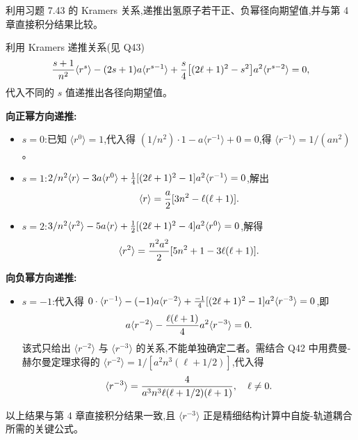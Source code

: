 \begin{question}
利用习题 7.43 的 Kramers 关系,递推出氢原子若干正、负幂径向期望值,并与第 4 章直接积分结果比较。
\begin{solution}
利用 Kramers 递推关系(见 Q43)
\[
{s+1\over n^2}\langle r^s\rangle - (2s+1)a\langle r^{s-1}\rangle + {s\over4}\bigl[(2\ell+1)^2-s^2\bigr]a^2\langle r^{s-2}\rangle = 0,
\]
代入不同的 $s$ 值递推出各径向期望值。

\textbf{向正幂方向递推:}
\begin{itemize}
\item $s=0$:已知 $\langle r^0\rangle=1$,代入得 $(1/n^2)\cdot1 - a\langle r^{-1}\rangle + 0=0$,得 $\langle r^{-1}\rangle=1/(an^2)$。
\item $s=1$:$2/n^2\langle r\rangle - 3a\langle r^0\rangle + {1\over4}[(2\ell+1)^2-1]a^2\langle r^{-1}\rangle = 0$,解出
  \[
  \langle r\rangle = {a\over2}[3n^2 - \ell(\ell+1)].
  \]
\item $s=2$:$3/n^2\langle r^2\rangle - 5a\langle r\rangle + {1\over2}[(2\ell+1)^2-4]a^2\langle r^0\rangle=0$,解得
  \[
  \langle r^2\rangle = {n^2a^2\over2}[5n^2+1-3\ell(\ell+1)].
  \]
\end{itemize}

\textbf{向负幂方向递推:}
\begin{itemize}
\item $s=-1$:代入得 $0\cdot\langle r^{-1}\rangle - (-1)a\langle r^{-2}\rangle + {-1\over4}[(2\ell+1)^2-1]a^2\langle r^{-3}\rangle=0$,即
  \[
  a\langle r^{-2}\rangle - {\ell(\ell+1)\over4}a^2\langle r^{-3}\rangle = 0.
  \]
  该式只给出 $\langle r^{-2}\rangle$ 与 $\langle r^{-3}\rangle$ 的关系,不能单独确定二者。需结合 Q42 中用费曼-赫尔曼定理求得的 $\langle r^{-2}\rangle=1/[a^2n^3(\ell+1/2)]$,代入得
  \[
  \langle r^{-3}\rangle = {4\over a^3 n^3\ell(\ell+1/2)(\ell+1)},\quad \ell\ne0.
  \]
\end{itemize}
以上结果与第 4 章直接积分结果一致,且 $\langle r^{-3}\rangle$ 正是精细结构计算中自旋-轨道耦合所需的关键公式。
\end{solution}
\end{question}

